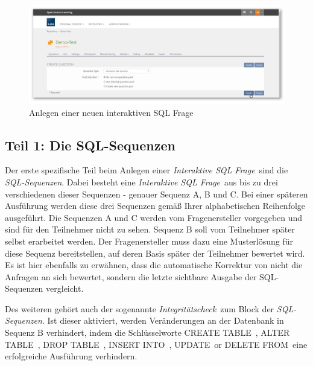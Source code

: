     \begin{figure}[H]
        \begin{center}
            \includegraphics[page=1, width=0.7\paperwidth, trim=4 4 4 4, clip]{fig/Create-Question.png} 
            \caption{Anlegen einer neuen interaktiven SQL Frage}
            \label{fig:create-question}
        \end{center}
    \end{figure}
    
\subsection{Teil 1: Die SQL-Sequenzen}

    Der erste  spezifische Teil beim Anlegen einer \glqq\textit{Interaktive SQL Frage}\grqq\ sind die \glqq\textit{SQL-Sequenzen}\grqq . Dabei besteht eine \glqq\textit{Interaktive SQL Frage}\grqq\ aus bis zu drei verschiedenen dieser Sequenzen - genauer Sequenz A, B und C. Bei einer späteren Ausführung werden diese drei Sequenzen gemäß Ihrer alphabetischen Reihenfolge ausgeführt. Die Sequenzen A und C werden vom Fragenersteller vorgegeben und sind für den Teilnehmer nicht zu sehen. Sequenz B soll vom Teilnehmer später selbst erarbeitet werden. Der Fragenersteller muss dazu eine Musterlösung für diese Sequenz bereitstellen, auf deren Basis später der Teilnehmer bewertet wird. Es ist hier ebenfalls zu erwähnen, dass die automatische Korrektur von  nicht die Anfragen an sich bewertet, sondern die letzte sichtbare Ausgabe der SQL-Sequenzen vergleicht.
    
    Des weiteren gehört auch der sogenannte \glqq\textit{Integritätscheck}\grqq\ zum Block der \glqq\textit{SQL-Sequenzen}\grqq . Ist dieser aktiviert, werden Veränderungen an der Datenbank in Sequenz B verhindert, indem die Schlüsselworte \glqq CREATE TABLE\grqq\ , \glqq ALTER TABLE\grqq\ , \glqq DROP TABLE\grqq\ , \glqq INSERT INTO\grqq\ , \glqq UPDATE\grqq\  or \glqq DELETE FROM\grqq\ eine erfolgreiche Ausführung verhindern.
    
